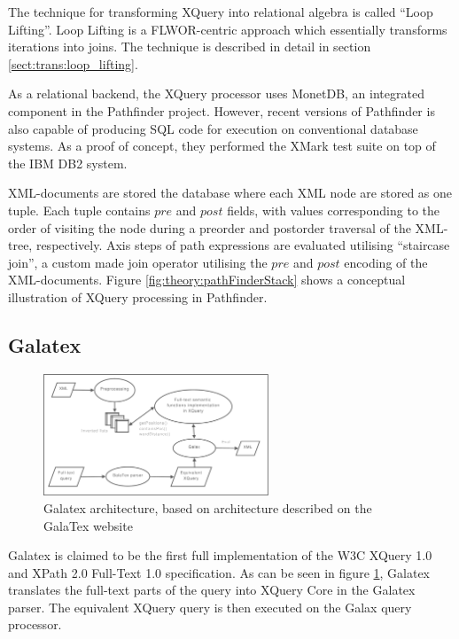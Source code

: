 The technique for transforming XQuery into relational algebra is called ``Loop
Lifting''\cite{pathfinder_mothertongue}. Loop Lifting is a FLWOR-centric
approach which essentially transforms iterations into joins. The technique is
described in detail in section \ref{sect:trans:loop_lifting}.

As a relational backend, the XQuery processor uses MonetDB, an integrated
component in the Pathfinder project. However, recent versions of Pathfinder is
also capable of producing SQL code for execution on conventional database
systems. As a proof of concept, they performed the XMark test suite on top of
the IBM DB2 system\cite{pathfinder_sql}.

XML-documents are stored the database where each XML node are stored as one tuple. Each tuple contains $pre$ and
$post$ fields, with values corresponding to the order of visiting the node during a preorder and postorder
traversal of the XML-tree, respectively. Axis steps of path expressions are evaluated utilising ``staircase
join'', a custom made join operator utilising the $pre$ and $post$ encoding of the XML-documents. Figure
\ref{fig:theory:pathFinderStack} shows a conceptual illustration of XQuery processing in Pathfinder.


\subsection{Galatex}
\begin{figure}[h]
  \centering
    \includegraphics[width=0.6\textwidth]{diagrams/galatex_arch}
  \caption[GalaTex architecture]{Galatex architecture, based on architecture described on
  the GalaTex website\cite{galatex}}
  \label{figure:galatex:arch}
\end{figure}
Galatex is claimed to be the first full implementation of the W3C XQuery 1.0 
and XPath 2.0 Full-Text 1.0 specification\cite{w3c01}. As can be seen in figure
\ref{figure:galatex:arch}, Galatex translates the full-text parts of the query
into XQuery Core\cite{xquery_semantics} in the Galatex parser. The equivalent
XQuery query is then executed on the Galax query processor.

